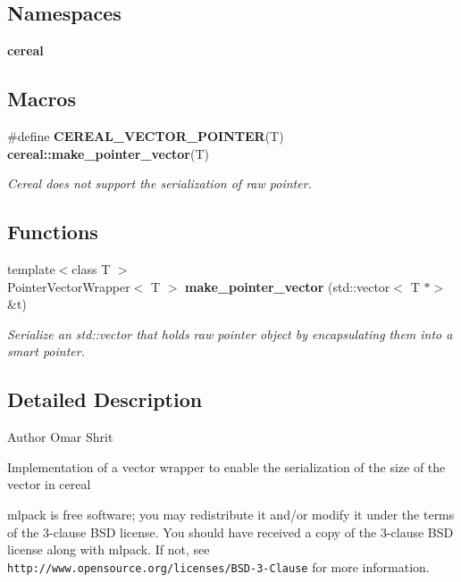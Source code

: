 \subsection*{Namespaces}
\begin{DoxyCompactItemize}
\item 
 \textbf{ cereal}
\end{DoxyCompactItemize}
\subsection*{Macros}
\begin{DoxyCompactItemize}
\item 
\#define \textbf{ C\+E\+R\+E\+A\+L\+\_\+\+V\+E\+C\+T\+O\+R\+\_\+\+P\+O\+I\+N\+T\+ER}(T)~\textbf{ cereal\+::make\+\_\+pointer\+\_\+vector}(T)
\begin{DoxyCompactList}\small\item\em Cereal does not support the serialization of raw pointer. \end{DoxyCompactList}\end{DoxyCompactItemize}
\subsection*{Functions}
\begin{DoxyCompactItemize}
\item 
{\footnotesize template$<$class T $>$ }\\Pointer\+Vector\+Wrapper$<$ T $>$ \textbf{ make\+\_\+pointer\+\_\+vector} (std\+::vector$<$ T $\ast$$>$ \&t)
\begin{DoxyCompactList}\small\item\em Serialize an std\+::vector that holds raw pointer object by encapsulating them into a smart pointer. \end{DoxyCompactList}\end{DoxyCompactItemize}


\subsection{Detailed Description}
\begin{DoxyAuthor}{Author}
Omar Shrit
\end{DoxyAuthor}
Implementation of a vector wrapper to enable the serialization of the size of the vector in cereal

mlpack is free software; you may redistribute it and/or modify it under the terms of the 3-\/clause B\+SD license. You should have received a copy of the 3-\/clause B\+SD license along with mlpack. If not, see {\tt http\+://www.\+opensource.\+org/licenses/\+B\+S\+D-\/3-\/\+Clause} for more information. 

